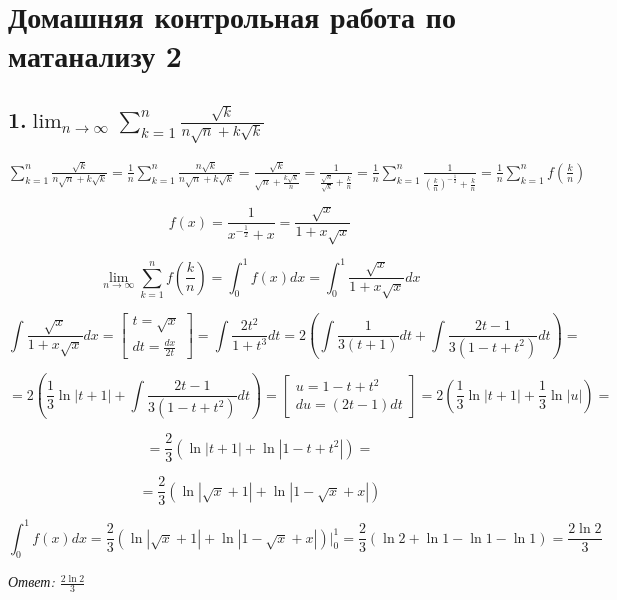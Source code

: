 \documentclass[a4paper]{article}
\author{Васильев Павел}
\begin{document}
\section*{Домашняя контрольная работа по матанализу 2}

\subsection*{1.$\displaystyle \lim_{n \rightarrow \infty} \sum_{k=1}^n \frac{\sqrt{k}}{n \sqrt{n} + k \sqrt{k}}$}

$\displaystyle \sum_{k=1}^n \frac{\sqrt{k}}{n \sqrt{n} + k \sqrt{k}} = \frac{1}{n} \sum_{k=1}^n \frac{n \sqrt{k}}{n \sqrt{n} + k \sqrt{k}} = \frac{\sqrt{k}}{\sqrt{n} + \frac{k \sqrt{k}}{n}} = \frac{1}{\frac{\sqrt{n}}{\sqrt{k}} + \frac{k}{n}} = \frac{1}{n} \sum_{k=1}^n \frac{1}{ \left( \frac{k}{n} \right)^{-\frac{1}{2}} + \frac{k}{n}} = \frac{1}{n} \sum_{k=1}^n f \left( \frac{k}{n} \right)$

\[ \displaystyle f(x) = \frac{1}{x^{-\frac{1}{2}} + x} = \frac{ \sqrt{x} }{1 + x \sqrt{x}}
\]

\[
\displaystyle \lim_{n \rightarrow \infty} \sum_{k=1}^n f \left(\frac{k}{n} \right) = \int_0^1 f(x) dx = \int_0^1 \frac{ \sqrt{x} }{1 + x \sqrt{x}} dx
\]

\[
\int \frac{ \sqrt{x} }{1 + x \sqrt{x}} dx = \begin{bmatrix}
t = \sqrt{x} \\
 dt = \frac{dx}{2t}
\end{bmatrix}
= \int \frac{2t^2}{1+t^3} dt = 2 \left( \int \frac{1}{3(t+1)} dt + \int \frac{2t-1}{3(1-t+t^2)} dt \right) =
\]

\[
= 2 \left( \frac{1}{3} \ln |t+1| +\int \frac{2t-1}{3(1-t+t^2)} dt \right) = \begin{bmatrix}
u = 1-t+t^2 \\ du = (2t-1)dt
\end{bmatrix} = 2 \left( \frac{1}{3} \ln |t+1| + \frac{1}{3} \ln|u| \right) =
\]

\[
= \frac{2}{3} \left(\ln |t+1| + \ln|1-t+t^2| \right) = 
\]

\[
= \frac{2}{3} \left( \ln |\sqrt{x}+1| + \ln|1-\sqrt{x}+x| \right)
\]

\[
\int_0^1 f(x)dx = \frac{2}{3} \left( \ln |\sqrt{x}+1| + \ln|1-\sqrt{x}+x| \right) \bigg|_0^1 = \frac{2}{3} \left( \ln 2 + \ln 1 - \ln 1 - \ln 1 \right) = \frac{2 \ln 2}{3}
\]

\textit{Ответ: $\frac{2 \ln 2}{3}$}
\end{document}
